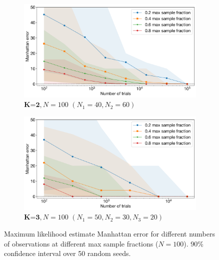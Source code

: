 \documentclass{article}
\theoremstyle{plain}
\theoremstyle{definition}
\theoremstyle{remark}
\begin{document}
\begin{figure}[h]
     \centering
     \begin{subfigure}[b]{0.49\textwidth}
         \centering
         \includegraphics[width=\textwidth]{scaling_k2_90ci.png}
         \caption{$\textbf{K=2}, N=100$ $(N_1=40, N_2=60)$}
         \label{fig:appendix_scaling_k=2}
     \end{subfigure}
     \hfill
     \begin{subfigure}[b]{0.49\textwidth}
         \centering
         \includegraphics[width=\textwidth]{scaling_k3_90ci.png}
         \caption{$\textbf{K=3}, N=100$ $(N_1=50, N_2=30, N_3=20)$}
         \label{fig:appendix_scaling_k=3}
     \end{subfigure}
     \caption{Maximum likelihood estimate Manhattan error for different numbers of observations at different max sample fractions ($N=100$). 90\% confidence interval over 50 random seeds.}
\end{figure}
\end{document}
